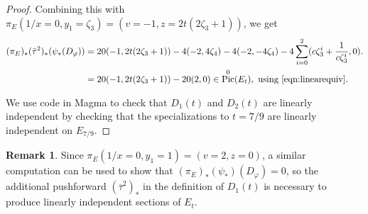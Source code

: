 \documentclass[reqno,10pt]{amsart}
\theoremstyle{definition}
\theoremstyle{definition}
\newtheorem{rem}[thm]{Remark}
\DeclareMathOperator{\Pic}{Pic}
\begin{document}
\begin{proof}
Combining this with $\pi_{E}(1/x=0,y_1=\zeta_3) = (v=-1,z = 2t(2 \zeta_3+1))$, we get
\begin{align*}(\pi_{E})_*(\bar{\tau}^2)_*(\psi_*(D_\varphi)) &= 20(-1, 2t(2\zeta_3+1)) - 4(-2, 4\zeta_4)-4(-2,-4\zeta_4)-4\sum_{i=0}^2 (c \zeta_3^i +\frac{1}{c\zeta_3^{i}},0). \\ &= 20(-1, 2t(2\zeta_3+1)) - 20(2,0) \in \Pic^0(E_t), \text{ using \Cref{eqn:linearequiv}.}\end{align*}

We use code \cite{code} in Magma \cite{magma} to check that $D_1(t)$ and $D_2(t)$ are linearly independent by checking that the specializations to $t=7/9$ are linearly independent on $E_{7/9}$. 
\end{proof}

\begin{rem}
Since $\pi_{E}(1/x=0,y_1=1) = (v=2,z=0)$, a similar computation can be used to show that  $(\pi_{E})_* (\psi_*)(D_{\varphi}) = 0$, so the additional pushforward $(\overline{\tau}^2)_*$ in the definition of $D_1(t)$ is necessary to produce linearly independent sections of $E_t$.
\end{rem}
\end{document}
